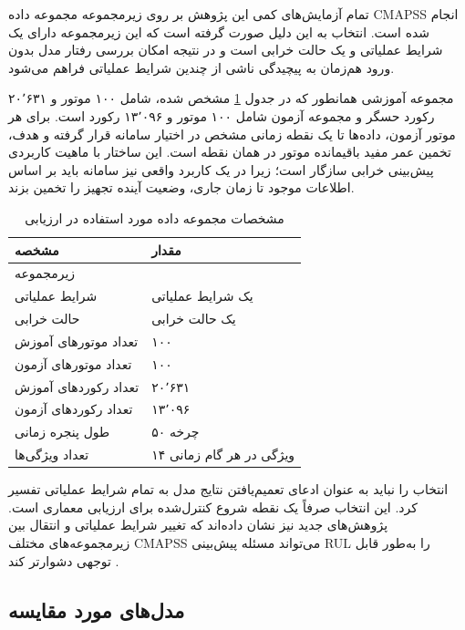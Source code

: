 تمام آزمایش‌های کمی این پژوهش بر روی زیرمجموعه  مجموعه داده \gls{CMAPSS} انجام شده است. انتخاب  به این دلیل صورت گرفته است که این زیرمجموعه دارای یک شرایط عملیاتی و یک حالت خرابی است و در نتیجه امکان بررسی رفتار مدل بدون ورود هم‌زمان به پیچیدگی ناشی از چندین شرایط عملیاتی فراهم می‌شود.

مجموعه آموزشی همانطور که در جدول 
\ref{tab:eval-data}
مشخص شده،
شامل ۱۰۰ موتور و ۲۰٬۶۳۱ رکورد حسگر و مجموعه آزمون شامل ۱۰۰ موتور و ۱۳٬۰۹۶ رکورد است. برای هر موتور آزمون، داده‌ها تا یک نقطه زمانی مشخص در اختیار سامانه قرار گرفته و هدف، تخمین عمر مفید باقیمانده موتور در همان نقطه است. این ساختار با ماهیت کاربردی پیش‌بینی خرابی سازگار است؛ زیرا در یک کاربرد واقعی نیز سامانه باید بر اساس اطلاعات موجود تا زمان جاری، وضعیت آینده تجهیز را تخمین بزند.

\begin{table}[ht]
	\centering
	\caption{مشخصات مجموعه داده مورد استفاده در ارزیابی}
	\label{tab:eval-data}
	\begin{tabular}{p{5cm}p{6cm}}
		\toprule
		\textbf{مشخصه} & \textbf{مقدار} \\
		\midrule
		زیرمجموعه & \lr{FD001} \\
		شرایط عملیاتی & یک شرایط عملیاتی \\
		حالت خرابی & یک حالت خرابی \\
		تعداد موتورهای آموزش & ۱۰۰ \\
		تعداد موتورهای آزمون & ۱۰۰ \\
		تعداد رکوردهای آموزش & ۲۰٬۶۳۱ \\
		تعداد رکوردهای آزمون & ۱۳٬۰۹۶ \\
		طول پنجره زمانی & ۵۰ چرخه \\
		تعداد ویژگی‌ها & ۱۴ ویژگی در هر گام زمانی \\
		\bottomrule
	\end{tabular}
\end{table}

انتخاب  را نباید به عنوان ادعای تعمیم‌یافتن نتایج مدل به تمام شرایط عملیاتی تفسیر کرد. این انتخاب صرفاً یک نقطه شروع کنترل‌شده برای ارزیابی معماری است. پژوهش‌های جدید نیز نشان داده‌اند که تغییر شرایط عملیاتی و انتقال بین زیرمجموعه‌های مختلف CMAPSS می‌تواند مسئله پیش‌بینی \gls{RUL} را به‌طور قابل توجهی دشوارتر کند \cite{diao2026reliable,song2026degradation}.

\subsection{مدل‌های مورد مقایسه}

